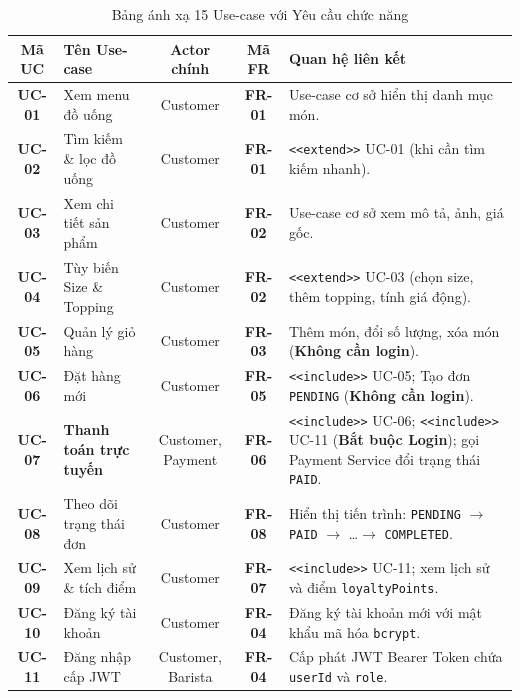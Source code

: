 \documentclass[12pt,a4paper]{article}
\begin{document}
\begin{table}[H]
\centering
\caption{Bảng ánh xạ 15 Use-case với Yêu cầu chức năng}
\label{tab:usecases}
\vspace{0.2cm}
\footnotesize
\renewcommand{\arraystretch}{1.25}
\begin{tabularx}{\textwidth}{|c|>{\raggedright\arraybackslash}p{3.5cm}|c|c|>{\raggedright\arraybackslash}X|}
\hline
\rowcolor{tableheader}
\textbf{Mã UC} & \textbf{Tên Use-case} & \textbf{Actor chính} & \textbf{Mã FR} & \textbf{Quan hệ liên kết} \\
\hline
\textbf{UC-01} & Xem menu đồ uống & Customer & \textbf{FR-01} & Use-case cơ sở hiển thị danh mục món. \\
\hline
\textbf{UC-02} & Tìm kiếm \& lọc đồ uống & Customer & \textbf{FR-01} & \texttt{<<extend>>} UC-01 (khi cần tìm kiếm nhanh). \\
\hline
\textbf{UC-03} & Xem chi tiết sản phẩm & Customer & \textbf{FR-02} & Use-case cơ sở xem mô tả, ảnh, giá gốc. \\
\hline
\textbf{UC-04} & Tùy biến Size \& Topping & Customer & \textbf{FR-02} & \texttt{<<extend>>} UC-03 (chọn size, thêm topping, tính giá động). \\
\hline
\textbf{UC-05} & Quản lý giỏ hàng & Customer & \textbf{FR-03} & Thêm món, đổi số lượng, xóa món (\textbf{Không cần login}). \\
\hline
\textbf{UC-06} & Đặt hàng mới & Customer & \textbf{FR-05} & \texttt{<<include>>} UC-05; Tạo đơn \texttt{PENDING} (\textbf{Không cần login}). \\
\hline
\textbf{UC-07} & \textbf{Thanh toán trực tuyến} & Customer, Payment & \textbf{FR-06} & \texttt{<<include>>} UC-06; \texttt{<<include>>} UC-11 (\textbf{Bắt buộc Login}); gọi Payment Service đổi trạng thái \texttt{PAID}. \\
\hline
\textbf{UC-08} & Theo dõi trạng thái đơn & Customer & \textbf{FR-08} & Hiển thị tiến trình: \texttt{PENDING} $\rightarrow$ \texttt{PAID} $\rightarrow$ \dots $\rightarrow$ \texttt{COMPLETED}. \\
\hline
\textbf{UC-09} & Xem lịch sử \& tích điểm & Customer & \textbf{FR-07} & \texttt{<<include>>} UC-11; xem lịch sử và điểm \texttt{loyaltyPoints}. \\
\hline
\textbf{UC-10} & Đăng ký tài khoản & Customer & \textbf{FR-04} & Đăng ký tài khoản mới với mật khẩu mã hóa \texttt{bcrypt}. \\
\hline
\textbf{UC-11} & Đăng nhập cấp JWT & Customer, Barista & \textbf{FR-04} & Cấp phát JWT Bearer Token chứa \texttt{userId} và \texttt{role}. \\

\end{tabularx}
\end{table}
\end{document}
